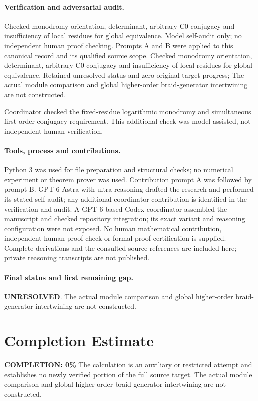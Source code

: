 \documentclass[11pt]{article}
\begin{document}
\paragraph{Verification and adversarial audit.}
Checked monodromy orientation, determinant, arbitrary C0 conjugacy and insufficiency of local residues for global equivalence. Model self-audit only; no independent human proof checking. Prompts A and B were applied to this canonical record and its qualified source scope. Checked monodromy orientation, determinant, arbitrary C0 conjugacy and insufficiency of local residues for global equivalence. Retained unresolved status and zero original-target progress; The actual module comparison and global higher-order braid-generator intertwining are not constructed.

Coordinator checked the fixed-residue logarithmic monodromy and simultaneous first-order conjugacy requirement. This additional check was model-assisted, not independent human verification.

\paragraph{Tools, process and contributions.}
Python 3 was used for file preparation and structural checks; no numerical experiment or theorem prover was used. Contribution prompt A was followed by prompt B. GPT-6 Astra with ultra reasoning drafted the research and performed its stated self-audit; any additional coordinator contribution is identified in the verification and audit. A GPT-6-based Codex coordinator assembled the manuscript and checked repository integration; its exact variant and reasoning configuration were not exposed. No human mathematical contribution, independent human proof check or formal proof certification is supplied. Complete derivations and the consulted source references are included here; private reasoning transcripts are not published.

\paragraph{Final status and first remaining gap.}
\textbf{UNRESOLVED}. The actual module comparison and global higher-order braid-generator intertwining are not constructed.

\section{Completion Estimate}
\noindent\textbf{COMPLETION: 0\%}
The calculation is an auxiliary or restricted attempt and establishes no newly verified portion of the full source target. The actual module comparison and global higher-order braid-generator intertwining are not constructed.
\end{document}
